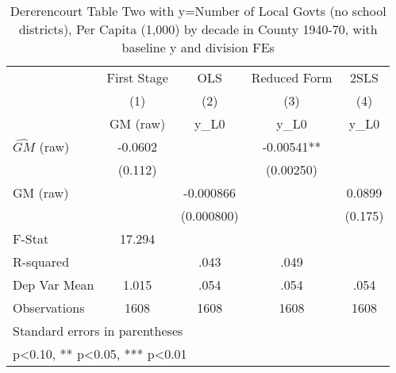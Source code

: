 \begin{table}[htbp]\centering
\def\sym#1{\ifmmode^{#1}\else\(^{#1}\)\fi}
\caption{Dererencourt Table Two with y=Number of Local Govts (no school districts), Per Capita (1,000) by decade in County 1940-70, with baseline y and division FEs}
\begin{tabular}{l*{4}{c}}
\toprule
                    & First Stage   &         OLS   &Reduced Form   &        2SLS   \\
                    &\multicolumn{1}{c}{(1)}&\multicolumn{1}{c}{(2)}&\multicolumn{1}{c}{(3)}&\multicolumn{1}{c}{(4)}\\
                    &\multicolumn{1}{c}{GM  (raw)}&\multicolumn{1}{c}{y\_L0}&\multicolumn{1}{c}{y\_L0}&\multicolumn{1}{c}{y\_L0}\\
\midrule
$\hat{GM}$ (raw)    &     -0.0602   &               &    -0.00541** &               \\
                    &     (0.112)   &               &   (0.00250)   &               \\
\addlinespace
GM  (raw)           &               &   -0.000866   &               &      0.0899   \\
                    &               &  (0.000800)   &               &     (0.175)   \\
\midrule
F-Stat              &      17.294   &               &               &               \\
R-squared           &               &        .043   &        .049   &               \\
Dep Var Mean        &       1.015   &        .054   &        .054   &        .054   \\
Observations        &        1608   &        1608   &        1608   &        1608   \\
\bottomrule
\multicolumn{5}{l}{\footnotesize Standard errors in parentheses}\\
\multicolumn{5}{l}{\footnotesize * p<0.10, ** p<0.05, *** p<0.01}\\
\end{tabular}
\end{table}

